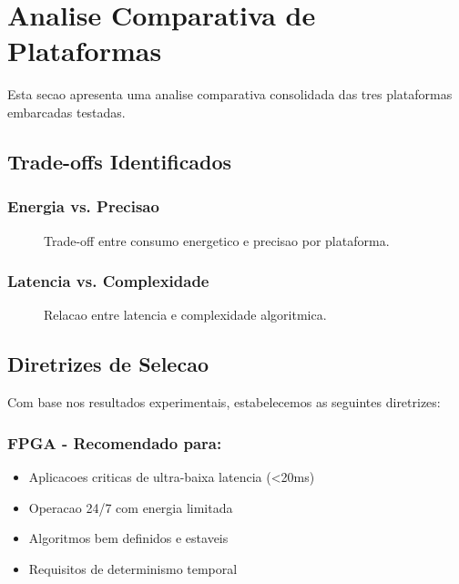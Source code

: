 \section{Analise Comparativa de Plataformas}\label{sec:analise_comparativa}

Esta secao apresenta uma analise comparativa consolidada das tres plataformas embarcadas testadas.

\subsection{Trade-offs Identificados}

\subsubsection{Energia vs. Precisao}
\begin{figure}[!htb]
\centering
\caption[Energy-Accuracy Trade-off]{Trade-off entre consumo energetico e precisao por plataforma.}
\label{fig:energia_precisao}
\end{figure}

\subsubsection{Latencia vs. Complexidade}
\begin{figure}[!htb]
\centering
\caption[Latency-Complexity Trade-off]{Relacao entre latencia e complexidade algoritmica.}
\label{fig:latencia_complexidade}
\end{figure}

\subsection{Diretrizes de Selecao}

Com base nos resultados experimentais, estabelecemos as seguintes diretrizes:

\subsubsection{FPGA - Recomendado para:}
\begin{itemize}
    \item Aplicacoes criticas de ultra-baixa latencia (<20ms)
    \item Operacao 24/7 com energia limitada
    \item Algoritmos bem definidos e estaveis
    \item Requisitos de determinismo temporal
\end{itemize}

